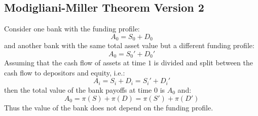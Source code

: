 \documentclass[10pt,a4paper]{article}
\begin{document}
    \subsection{Modigliani-Miller Theorem Version 2}
        Consider one bank with the funding profile:
            \begin{equation}
                A_{0} = S_{0} + D_{0}
            \end{equation}
        and another bank with the same total asset value but a different funding profile:
            \begin{equation}
                A_{0} = S_{0}' + D_{0}'
            \end{equation}
        Assuming that the cash flow of assets at time $1$ is divided and split between the cash flow to depositors and equity, i.e.:
            \begin{equation}
                A_{i} = S_{i} + D_{i} = S_{i}'+D_{i}'
            \end{equation}
        then the total value of the bank payoffs at time $0$ is $A_{0}$ and:
            \begin{equation}
                A_{0} = \pi(S) + \pi(D) = \pi(S') + \pi(D')
            \end{equation}
        Thus the value of the bank does not depend on the funding profile. 
\end{document}
